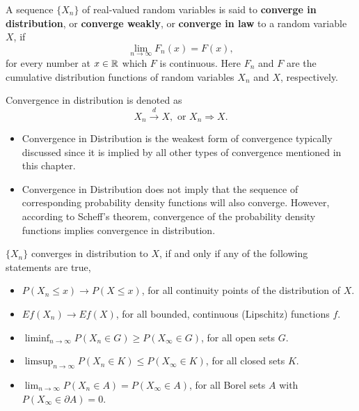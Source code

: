 \begin{definition} \label{def:convergence-in-distribution}
	A sequence $\{X_n\}$ of real-valued random variables is said to \textbf{converge in distribution}, or \textbf{converge weakly}, or \textbf{converge in law} to a random variable $X$, if
	\begin{equation}
		\lim_{n\to\infty}F_n(x)=F(x),
	\end{equation}
	for every number at $x\in{\mathbb R}$ which $F$ is continuous. Here $F_n$ and $F$ are the cumulative distribution functions of random variables $X_n$ and $X$, respectively.

	Convergence in distribution is denoted as
	\begin{equation}
		X_n \stackrel{d}{\rightarrow} X, \text{ or } X_n \Rightarrow X.
	\end{equation}
\end{definition}

\begin{itemize}
	\item Convergence in Distribution is the weakest form of convergence typically discussed since it is implied by all other types of convergence mentioned in this chapter.
	\item Convergence in Distribution does not imply that the sequence of corresponding probability density functions will also converge. However, according to Scheff's theorem, convergence of the probability density functions implies convergence in distribution.
\end{itemize}

\begin{theorem} \label{thm:portmanteau-lemma}
	$\{X_n\}$ converges in distribution to $X$, if and only if any of the following statements are true,
	\begin{itemize}
		\item $P(X_n\leq x)\rightarrow P(X\leq x)$, for all continuity points of the distribution of $X$.
		\item $Ef(X_n)\rightarrow Ef(X)$, for all bounded, continuous (Lipschitz) functions $f$.
		\item $\liminf_{n\rightarrow\infty}P\left(X_{n} \in G\right)\geq P\left(X_{\infty}\in G\right)$, for all open sets $G$.
		\item $\limsup_{n \rightarrow\infty}P\left(X_{n} \in K\right) \leq P\left(X_{\infty} \in K\right)$, for all closed sets $K$.
		\item $\lim_{n\rightarrow\infty}P\left(X_{n}\in A\right)=P\left(X_{\infty}\in A\right)$, for all Borel sets $A$ with $P\left(X_{\infty}\in \partial A\right)=0$.
	\end{itemize}
\end{theorem}

